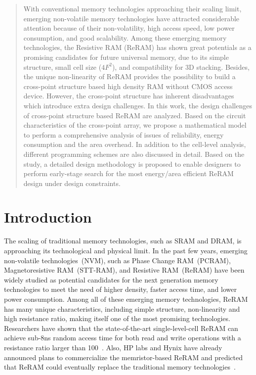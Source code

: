 \begin{abstract}
With conventional memory technologies approaching their scaling limit, emerging non-volatile memory technologies have attracted considerable attention because of their non-volatility, high access speed, low power consumption, and good scalability. Among these emerging memory technologies, the Resistive RAM (ReRAM) has shown great potentials as a promising candidates for future universal memory, due to its simple structure, small cell size ($4F^2$), and compatibility for 3D stacking. Besides, the unique non-linearity of ReRAM provides the possibility to build a cross-point structure based high density RAM without CMOS access device. However, the cross-point structure has inherent disadvantages which introduce extra design challenges. In this work, the design challenges of cross-point structure based ReRAM are analyzed. Based on the circuit characteristics of the cross-point array, we propose a mathematical model to perform a comprehensive analysis of issues of reliability, energy consumption and the area overhead. In addition to the cell-level analysis, different programming schemes are also discussed in detail. Based on the study, a detailed design methodology is proposed to enable designers to perform early-stage search for the most energy/area efficient ReRAM design under design constraints.
\end{abstract}

\section{Introduction}\label{sec:intro}
The scaling of traditional memory technologies, such as SRAM and DRAM, is approaching its technological and physical limit. 
In the past few years, emerging non-volatile technologies~(NVM), such as Phase Change RAM~(PCRAM), Magnetoresistive RAM~(STT-RAM), and Resistive RAM~(ReRAM) have been widely studied as potential candidates for the next generation memory technologies to meet the need of higher density, faster access time, and lower power consumption. Among all of these emerging memory technologies, ReRAM has many unique characteristics, including simple structure, non-linearity and high resistance ratio, making itself one of the most promising technologies. Researchers have shown that the state-of-the-art single-level-cell ReRAM can achieve sub-8ns random access time for both read and write operations with a resistance ratio larger than 100~\cite{ReRAM_ISSCC2011_Sheu}. Also, HP labs and Hynix have already announced plans to commercialize the memristor-based ReRAM and predicted that ReRAM could eventually replace the traditional memory technologies~\cite{memristor:HpHynix}.

